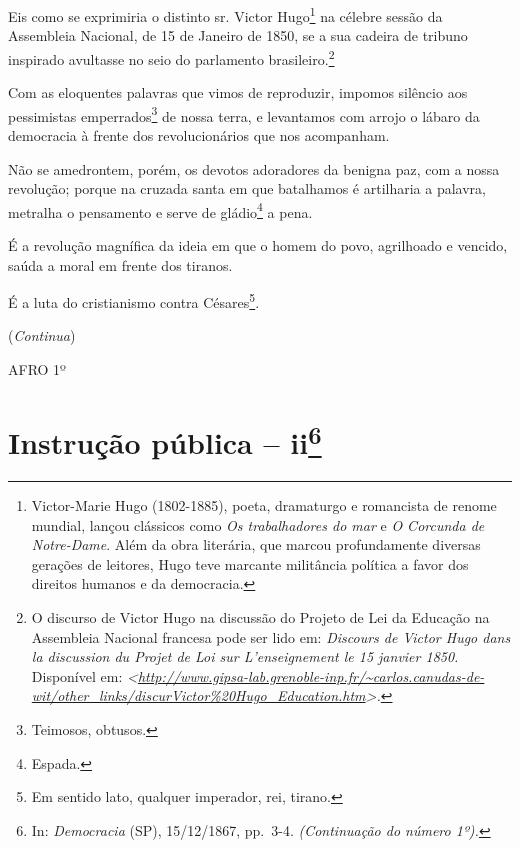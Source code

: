 Eis como se exprimiria o distinto sr. Victor Hugo\footnote{
  Victor-Marie Hugo (1802-1885), poeta, dramaturgo e romancista de
  renome mundial, lançou clássicos como \emph{Os trabalhadores do mar} e
  \emph{O Corcunda de Notre-Dame}. Além da obra literária, que marcou
  profundamente diversas gerações de leitores, Hugo teve marcante
  militância política a favor dos direitos humanos e da democracia.} na
célebre sessão da Assembleia Nacional, de 15 de Janeiro de 1850, se a
sua cadeira de tribuno inspirado avultasse no seio do parlamento
brasileiro.\footnote{O discurso de Victor Hugo na discussão do Projeto
  de Lei da Educação na Assembleia Nacional francesa pode ser lido em:
  \emph{Discours de Victor Hugo dans la discussion du Projet de Loi sur
  L'enseignement le 15 janvier 1850.} Disponível em:
  \emph{\textless{}\url{http://www.gipsa-lab.grenoble-inp.fr/~carlos.canudas-de-wit/other_links/discurVictor\%20Hugo_Education.htm}\textgreater.}}

Com as eloquentes palavras que vimos de reproduzir, impomos silêncio aos
pessimistas emperrados\footnote{Teimosos, obtusos.} de nossa terra, e
levantamos com arrojo o lábaro da democracia à frente dos
revolucionários que nos acompanham.

Não se amedrontem, porém, os devotos adoradores da benigna paz, com a
nossa revolução; porque na cruzada santa em que batalhamos é artilharia
a palavra, metralha o pensamento e serve de gládio\footnote{Espada.} a
pena.

É a revolução magnífica da ideia em que o homem do povo, agrilhoado e
vencido, saúda a moral em frente dos tiranos.

É a luta do cristianismo contra Césares\footnote{Em sentido lato,
  qualquer imperador, rei, tirano.}.

(\emph{Continua})

AFRO 1º

\chapter{Instrução pública -- ii\footnote{In: \emph{Democracia} (SP),
  15/12/1867, pp.~3-4. \emph{(Continuação do número 1º).}}}

